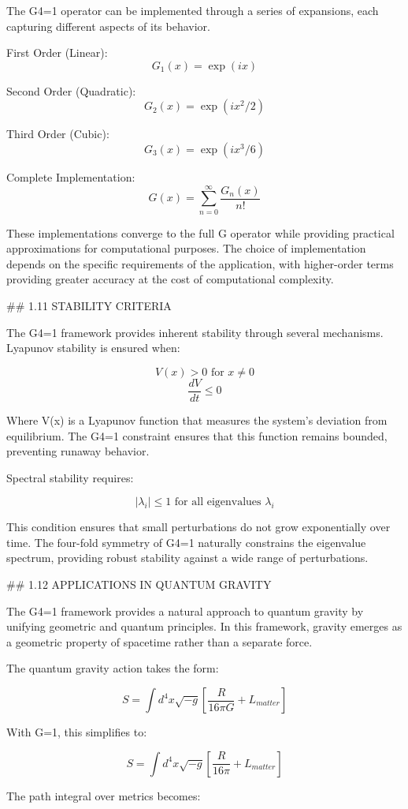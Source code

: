 The G4=1 operator can be implemented through a series of expansions, each capturing different aspects of its behavior.

First Order (Linear):
$$G_1(x) = \exp(ix)$$

Second Order (Quadratic):
$$G_2(x) = \exp(ix^2/2)$$

Third Order (Cubic):
$$G_3(x) = \exp(ix^3/6)$$

Complete Implementation:
$$G(x) = \sum_{n=0}^{\infty} \frac{G_n(x)}{n!}$$

These implementations converge to the full G operator while providing practical approximations for computational purposes. The choice of implementation depends on the specific requirements of the application, with higher-order terms providing greater accuracy at the cost of computational complexity.

## 1.11 STABILITY CRITERIA

The G4=1 framework provides inherent stability through several mechanisms. Lyapunov stability is ensured when:

$$V(x) > 0 \text{ for } x \neq 0$$
$$\frac{dV}{dt} \leq 0$$

Where V(x) is a Lyapunov function that measures the system's deviation from equilibrium. The G4=1 constraint ensures that this function remains bounded, preventing runaway behavior.

Spectral stability requires:

$$|\lambda_i| \leq 1 \text{ for all eigenvalues } \lambda_i$$

This condition ensures that small perturbations do not grow exponentially over time. The four-fold symmetry of G4=1 naturally constrains the eigenvalue spectrum, providing robust stability against a wide range of perturbations.

## 1.12 APPLICATIONS IN QUANTUM GRAVITY

The G4=1 framework provides a natural approach to quantum gravity by unifying geometric and quantum principles. In this framework, gravity emerges as a geometric property of spacetime rather than a separate force.

The quantum gravity action takes the form:

$$S = \int d^4x\sqrt{-g}\left[\frac{R}{16\pi G} + L_{matter}\right]$$

With G=1, this simplifies to:

$$S = \int d^4x\sqrt{-g}\left[\frac{R}{16\pi} + L_{matter}\right]$$

The path integral over metrics becomes:


